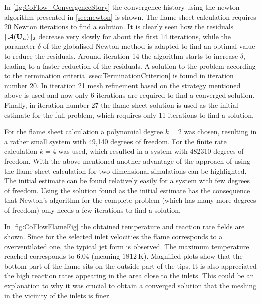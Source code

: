 In \cref{fig:CoFlow_ConvergenceStory} the convergence history using the newton algorithm presented in \cref{sec:newton} is shown. The flame-sheet calculation requires 20 Newton iterations to find a solution. It is clearly seen how the residuals $\| \mathcal{A}(\textbf{U}_{n}) \|_2 $  decrease very slowly for about the first 14 iterations, while the parameter $\delta$ of the globalised Newton method is adapted to find an optimal value to reduce the residuals. Around iteration 14 the algorithm starts to increase $\delta$, leading to a faster reduction of the residuals. A solution to the problem according to the termination criteria \cref{ssec:TerminationCriterion} is found in iteration number 20. In iteration 21 mesh refinement based on the strategy mentioned above is used and now only 6 iterations are required to find a converged solution. Finally, in iteration number 27 the flame-sheet solution is used as the initial estimate for the full problem, which requires only 11 iterations to find a solution.  

For the flame sheet calculation a polynomial degree $k = 2$ was chosen, resulting in a rather small system with 49,140 degrees of freedom. For the finite rate calculation $k = 4$ was used, which resulted in a system with 482310 degrees of freedom.  With the above-mentioned another advantage of the approach of using the flame sheet calculation for two-dimensional simulations can be highlighted. The initial estimate can be found relatively easily for a system with few degrees of freedom. Using the solution found as the initial estimate has the consequence that Newton's algorithm for the complete problem (which has many more degrees of freedom) only needs a few iterations to find a solution.

In \cref{fig:CoFlowFlameFig} the obtained temperature and reaction rate fields are shown. Since for the selected inlet velocities the flame corresponds to a overventilated one, the typical jet form is observed. The maximum temperature reached corresponds to 6.04 (meaning $\SI{1812}{\kelvin}$). Magnified plots show that the bottom part of the flame sits on the outside part of the tips. It is also appreciated the high reaction rates appearing in the area close to the inlets. This could be an explanation to why it was crucial  to obtain a converged solution that the meshing in the vicinity of the inlets is finer.

